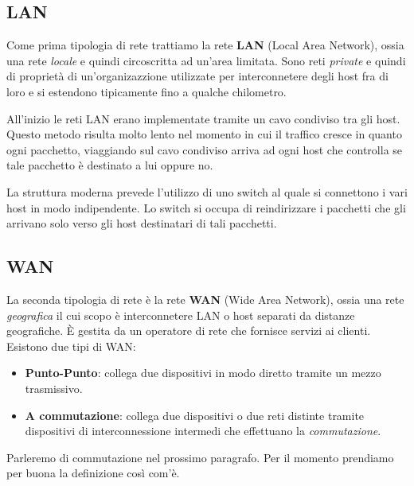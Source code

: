 \subsection{LAN}
Come prima tipologia di rete trattiamo la rete \textbf{LAN} (Local
Area Network), ossia una rete \emph{locale} e quindi circoscritta ad
un'area limitata. Sono reti \emph{private} e quindi di proprietà di 
un'organizazzione utilizzate per interconnetere degli host fra di loro 
e si estendono tipicamente fino a qualche chilometro.

All'inizio le reti LAN erano implementate tramite un cavo condiviso
tra gli host. Questo metodo risulta molto lento nel momento in cui il
traffico cresce in quanto ogni pacchetto, viaggiando sul cavo condiviso
arriva ad ogni host che controlla se tale pacchetto è destinato a lui 
oppure no.

La struttura moderna prevede l'utilizzo di uno switch al quale si 
connettono i vari host in modo indipendente. Lo switch si occupa di
reindirizzare i pacchetti che gli arrivano solo verso gli host
destinatari di tali pacchetti.

\subsection{WAN}
La seconda tipologia di rete è la rete \textbf{WAN} (Wide Area 
Network), ossia una rete \emph{geografica} il cui scopo è 
interconnetere LAN o host separati da distanze geografiche. \`E gestita
da un operatore di rete che fornisce servizi ai clienti. Esistono due 
tipi di WAN:
\begin{itemize}
	\item \textbf{Punto-Punto}: collega due dispositivi in modo
		diretto tramite un mezzo trasmissivo.
	\item \textbf{A commutazione}: collega due dispositivi o due reti
		distinte tramite dispositivi di interconnessione intermedi che
		effettuano la \emph{commutazione}.
\end{itemize}
Parleremo di commutazione nel prossimo paragrafo. Per il momento
prendiamo per buona la definizione così com'è.


